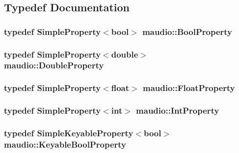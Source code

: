 \subsection{Typedef Documentation}
\hypertarget{namespacemaudio_a7765d14406acfae1163f970c3d1c09fa}{
\subsubsection[{Bool\-Property}]{\setlength{\rightskip}{0pt plus 5cm}typedef {\bf Simple\-Property}$<$bool$>$ {\bf maudio\-::\-Bool\-Property}}}\label{namespacemaudio_a7765d14406acfae1163f970c3d1c09fa}
\hypertarget{namespacemaudio_a6fddf715e71e9788beac91a457c79bc1}{
\subsubsection[{Double\-Property}]{\setlength{\rightskip}{0pt plus 5cm}typedef {\bf Simple\-Property}$<$double$>$ {\bf maudio\-::\-Double\-Property}}}\label{namespacemaudio_a6fddf715e71e9788beac91a457c79bc1}
\hypertarget{namespacemaudio_a16d55dea341845809a721d83bfac26de}{
\subsubsection[{Float\-Property}]{\setlength{\rightskip}{0pt plus 5cm}typedef {\bf Simple\-Property}$<$float$>$ {\bf maudio\-::\-Float\-Property}}}\label{namespacemaudio_a16d55dea341845809a721d83bfac26de}
\hypertarget{namespacemaudio_aa573bfbf875a5e5678fa6d934084cc47}{
\subsubsection[{Int\-Property}]{\setlength{\rightskip}{0pt plus 5cm}typedef {\bf Simple\-Property}$<$int$>$ {\bf maudio\-::\-Int\-Property}}}\label{namespacemaudio_aa573bfbf875a5e5678fa6d934084cc47}
\hypertarget{namespacemaudio_af68f7cbd0c3bf9f5129f9277e9f9a110}{
\subsubsection[{Keyable\-Bool\-Property}]{\setlength{\rightskip}{0pt plus 5cm}typedef {\bf Simple\-Keyable\-Property}$<$bool$>$ {\bf maudio\-::\-Keyable\-Bool\-Property}}}\label{namespacemaudio_af68f7cbd0c3bf9f5129f9277e9f9a110}
